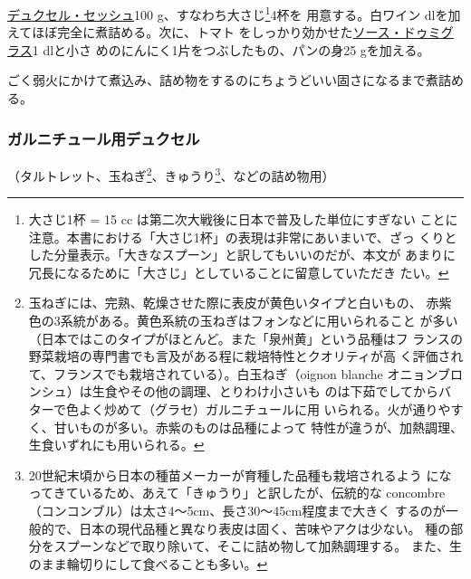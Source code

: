 \begin{recette}
\protect\hyperlink{duxelles-seche}{デュクセル・セッシュ}100
g、すなわち大さじ\footnote{大さじ1杯 = 15 cc
  は第二次大戦後に日本で普及した単位にすぎない
  ことに注意。本書における「大さじ1杯」の表現は非常にあいまいで、ざっ
  くりとした分量表示。「大きなスプーン」と訳してもいいのだが、本文が
  あまりに冗長になるために「大さじ」としていることに留意していただき
  たい。}4杯を 用意する。白ワイン\undemi{}
dlを加えてほぼ完全に煮詰める。次に、トマト
をしっかり効かせた\protect\hyperlink{sauce-demi-glace}{ソース・ドゥミグラス}1
dlと小さ めのにんにく1片をつぶしたもの、パンの身25 gを加える。

ごく弱火にかけて煮込み、詰め物をするのにちょうどいい固さになるまで煮詰める。

\maeaki

\hypertarget{duxelles-pour-farnitures-diverses}{%
\subsubsection{ガルニチュール用デュクセル}\label{duxelles-pour-farnitures-diverses}}



（タルトレット、玉ねぎ\footnote{玉ねぎには、完熟、乾燥させた際に表皮が黄色いタイプと白いもの、
  赤紫色の3系統がある。黄色系統の玉ねぎはフォンなどに用いられること
  が多い（日本ではこのタイプがほとんど。また「泉州黄」という品種はフ
  ランスの野菜栽培の専門書でも言及がある程に栽培特性とクオリティが高
  く評価されて、フランスでも栽培されている）。白玉ねぎ（oignon blanche
  オニョンブロンシュ）は生食やその他の調理、とりわけ小さいも
  のは下茹でしてからバターで色よく炒めて（グラセ）ガルニチュールに用
  いられる。火が通りやすく、甘いものが多い。赤紫のものは品種によって
  特性が違うが、加熱調理、生食いずれにも用いられる。}、きゅうり\footnote{20世紀末頃から日本の種苗メーカーが育種した品種も栽培されるよう
  になってきているため、あえて「きゅうり」と訳したが、伝統的な concombre
  （コンコンブル）は太さ4〜5cm、長さ30〜45cm程度まで大きく
  するのが一般的で、日本の現代品種と異なり表皮は固く、苦味やアクは少ない。
  種の部分をスプーンなどで取り除いて、そこに詰め物して加熱調理する。
  また、生のまま輪切りにして食べることも多い。}、などの詰め物用）


\end{recette}
